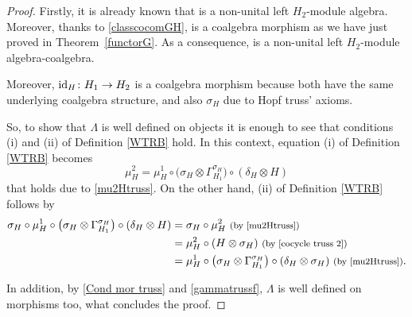 \documentclass[pdftex]{sigma}
\numberwithin{equation}{section}
\begin{document}
\begin{proof}
Firstly, it is already known that  is a non-unital left $H_{2}$-module algebra. Moreover, thanks to \eqref{classcocomGH},  is a coalgebra morphism as we have just proved in Theorem~\ref{functorG}. As a consequence,  is a non-unital left $H_{2}$-module algebra-coalgebra.

Moreover, ${\rm id}_{H}\colon H_{1}\rightarrow H_{2}$ is a coalgebra morphism because both have the same underlying coalgebra structure, and also $\sigma_{H}$ due to Hopf truss' axioms.

So, to show that $\Lambda$ is well defined on objects it is enough to see that conditions (i) and (ii) of Definition \ref{WTRB} hold. In this context, equation (i) of Definition \ref{WTRB} becomes
\[
\mu_{H}^{2}=\mu_{H}^{1}\circ\bigl(\sigma_{H}\otimes\Gamma_{H_{1}}^{\sigma_{H}}\bigr)\circ(\delta_{H}\otimes H)
\]
 that holds due to \eqref{mu2Htruss}. On the other hand, (ii) of Definition \ref{WTRB} follows by
\begin{align*}
\sigma_{H}\circ\mu_{H}^{1}\circ\bigl(\sigma_{H}\otimes\Gamma_{H_{1}}^{\sigma_{H}}\bigr)\circ(\delta_{H}\otimes H)
={}&\sigma_{H}\circ\mu_{H}^{2}\ \text{\footnotesize\textnormal{(by \eqref{mu2Htruss})}}\\
={}&\mu_{H}^{2}\circ(H\otimes\sigma_{H})\ \text{\footnotesize\textnormal{(by \eqref{cocycle truss 2})}}\\
={}&\mu_{H}^{1}\circ\bigl(\sigma_{H}\otimes\Gamma_{H_{1}}^{\sigma_{H}}\bigr)\circ(\delta_{H}\otimes\sigma_{H})\ \text{\footnotesize\textnormal{(by \eqref{mu2Htruss})}}.
\end{align*}

In addition, by \eqref{Cond mor truss} and \eqref{gammatrussf}, $\Lambda$ is well defined on morphisms too, what concludes the proof.
\end{proof}
\end{document}
